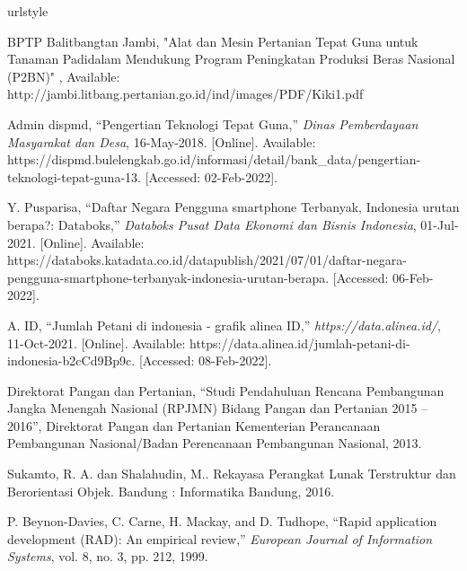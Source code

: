 
\begin{thebibliography}{7}
%
\providecommand{\natexlab}[1]{#1}
\providecommand{\url}[1]{\texttt{#1}}
\expandafter\ifx\csname urlstyle\endcsname\relax
  \providecommand{\doi}[1]{doi: #1}\else
  \providecommand{\doi}{doi: \begingroup \urlstyle{rm}\Url}\fi


BPTP Balitbangtan Jambi, "Alat dan Mesin Pertanian Tepat Guna untuk Tanaman Padidalam Mendukung Program Peningkatan Produksi Beras Nasional (P2BN)"
, Available: http://jambi.litbang.pertanian.go.id/ind/images/PDF/Kiki1.pdf

Admin dispmd, “Pengertian Teknologi Tepat Guna,” \emph{Dinas Pemberdayaan Masyarakat dan Desa}, 16-May-2018. [Online]. Available: https://dispmd.bulelengkab.go.id/informasi/detail/bank\_data/pengertian-teknologi-tepat-guna-13. [Accessed: 02-Feb-2022]. 

Y. Pusparisa, “Daftar Negara Pengguna smartphone Terbanyak, Indonesia urutan berapa?: Databoks,” \emph{Databoks Pusat Data Ekonomi dan Bisnis Indonesia}, 01-Jul-2021. [Online]. Available: https://databoks.katadata.co.id/datapublish/2021/07/01/daftar-negara-pengguna-smartphone-terbanyak-indonesia-urutan-berapa. [Accessed: 06-Feb-2022]. 

A. ID, “Jumlah Petani di indonesia - grafik alinea ID,” \emph{https://data.alinea.id/}, 11-Oct-2021. [Online]. Available: https://data.alinea.id/jumlah-petani-di-indonesia-b2cCd9Bp9c. [Accessed: 08-Feb-2022]. 

Direktorat Pangan dan Pertanian, “Studi Pendahuluan Rencana Pembangunan Jangka Menengah Nasional (RPJMN) Bidang Pangan dan Pertanian 2015 – 2016”, Direktorat Pangan dan Pertanian Kementerian Perancanaan Pembangunan Nasional/Badan Perencanaan Pembangunan Nasional, 2013.

Sukamto, R. A. dan Shalahudin, M.. Rekayasa Perangkat Lunak Terstruktur dan Berorientasi Objek. Bandung : Informatika Bandung, 2016.

P. Beynon-Davies, C. Carne, H. Mackay, and D. Tudhope, “Rapid application development (RAD): An empirical review,” \emph{European Journal of Information Systems}, vol. 8, no. 3, pp. 212, 1999. 


\end{thebibliography}
